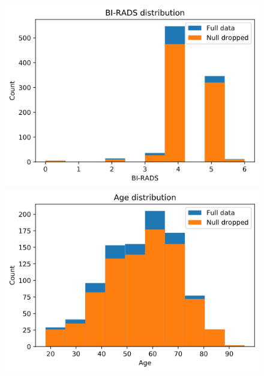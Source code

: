 \documentclass[11pt,a4paper]{article}
\begin{document}
\begin{figure}[H]
\centering

\begin{minipage}{0.5\textwidth}
    \centering
    \includegraphics[scale=0.35]{img/birads-distribution.png}
\end{minipage}%
\begin{minipage}{0.5\textwidth}
    \centering
    \includegraphics[scale=0.35]{img/age-distribution.png}
\end{minipage}

\end{figure}
\end{document}
